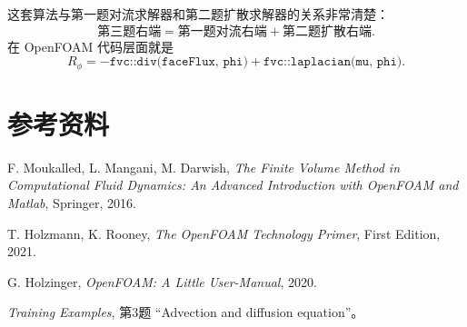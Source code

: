 \documentclass[UTF8,12pt,a4paper]{ctexart}
\numberwithin{equation}{section}
\begin{document}
这套算法与第一题对流求解器和第二题扩散求解器的关系非常清楚：
\begin{equation}
  \boxed{
  \text{第三题右端}
  =
  \text{第一题对流右端}
  +
  \text{第二题扩散右端}.}
\end{equation}
在 OpenFOAM 代码层面就是
\begin{equation}
  \boxed{
  R_\phi
  =
  -\texttt{fvc::div(faceFlux, phi)}
  +
  \texttt{fvc::laplacian(mu, phi)}.}
\end{equation}

\section*{参考资料}

\begin{description}[leftmargin=3.2em,labelwidth=2.5em,style=nextline]
  \item[R1] F. Moukalled, L. Mangani, M. Darwish, \textit{The Finite Volume Method in Computational Fluid Dynamics: An Advanced Introduction with OpenFOAM and Matlab}, Springer, 2016.
  \item[R2] T. Holzmann, K. Rooney, \textit{The OpenFOAM Technology Primer}, First Edition, 2021.
  \item[R3] G. Holzinger, \textit{OpenFOAM: A Little User-Manual}, 2020.
  \item[题目] \textit{Training Examples}, 第3题 ``Advection and diffusion equation''。
\end{description}
\end{document}
